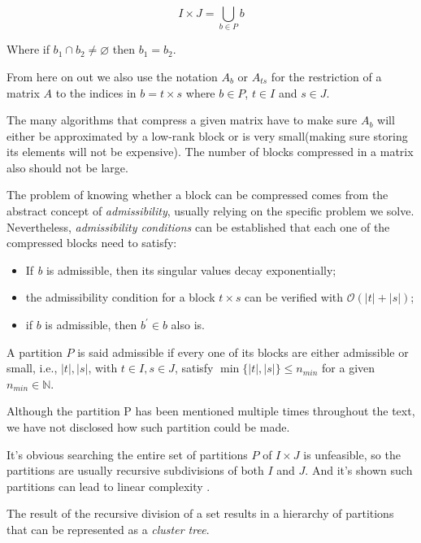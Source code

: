 \begin{equation}\label{eq:union_partition}
    I \times J = \bigcup_{b \in P} b
\end{equation}

Where if $b_{1} \cap b_{2} \neq \varnothing $ then $b_{1} = b_{2}$.

From here on out we also use the notation $A_{b}$ or $A_{ts}$ for the restriction of a matrix $A$ to the indices in $b= t \times s$ where $b \in P$, $t \in I$ and $s \in J$.

The many algorithms that compress a given matrix have to make sure $A_{b}$ will either be approximated by a low-rank block or is very small(making sure storing its elements will not be expensive). The number of blocks compressed in a matrix also should not be large.

The problem of knowing whether a block can be compressed comes from the abstract concept of \textit{admissibility}, usually relying on the specific problem we solve. Nevertheless, \textit{admissibility conditions} can be established that each one of the compressed blocks need to satisfy:

\begin{itemize}
    \item If \textit{b} is admissible, then its singular values decay exponentially;
    \item the admissibility condition for a block $t \times s$ can be verified with $\mathcal{O}(|t| + |s|)$;
    \item if $b$ is admissible, then $b^{'} \in b$ also is.
\end{itemize}

A partition $P$ is said admissible if every one of its blocks are either admissible or small, i.e., $|t|, |s|$, with $t \in I, s \in J$, satisfy $\min\{|t|,|s| \} \leq n_{min}$ for a given $n_{min} \in \mathbb{N}$.

Although the partition P has been mentioned multiple times throughout the text, we have not disclosed how such partition could be made.

It's obvious searching the entire set of partitions $P$ of $I \times J$ is unfeasible, so the partitions are usually  recursive subdivisions of both $I$ and $J$. And it's shown such partitions can lead to linear complexity \cite{bebendorf2008hierarchical}.

The result of the recursive division of a set results in a hierarchy of partitions that can be represented as a \textit{cluster tree}.

